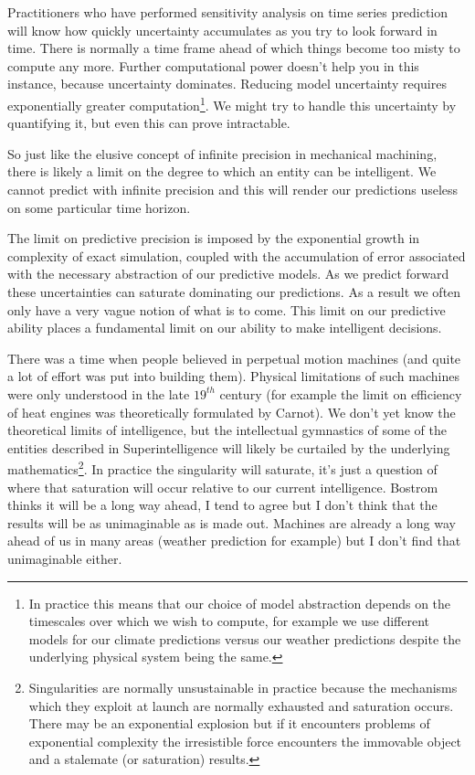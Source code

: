\documentclass[a4paper]{caesar_book}
\begin{document}
Practitioners who have performed sensitivity analysis on time series prediction will know how quickly uncertainty accumulates as you try to look forward in time. There is normally a time frame ahead of which things become too misty to compute any more. Further computational power doesn't help you in this instance, because uncertainty dominates. Reducing model uncertainty requires exponentially greater computation\footnote{In practice this means that our choice of model abstraction depends on the timescales over which we wish to compute, for example we use different models for our climate predictions versus our weather predictions despite the underlying physical system being the same.}. We might try to handle this uncertainty by quantifying it, but even this can prove intractable.

So just like the elusive concept of infinite precision in mechanical machining, there is likely a limit on the degree to which an entity can be intelligent. We cannot predict with infinite precision and this will render our predictions useless on some particular time horizon.

The limit on predictive precision is imposed by the exponential growth in complexity of exact simulation, coupled with the accumulation of error associated with the necessary abstraction of our predictive models. As we predict forward these uncertainties can saturate dominating our predictions. As a result we often only have a very vague notion of what is to come. This limit on our predictive ability places a fundamental limit on our ability to make intelligent decisions.

There was a time when people believed in perpetual motion machines (and quite a lot of effort was put into building them). Physical limitations of such machines were only understood in the late $19^{th}$ century (for example the limit on efficiency of heat engines was theoretically formulated by Carnot). We don’t yet know the theoretical limits of intelligence, but the intellectual gymnastics of some of the entities described in Superintelligence will likely be curtailed by the underlying mathematics\footnote{Singularities are normally unsustainable in practice because the mechanisms which they exploit at launch are normally exhausted and saturation occurs. There may be an exponential explosion but if it encounters problems of exponential complexity the irresistible force encounters the immovable object and a stalemate (or saturation) results.}. In practice the singularity will saturate, it’s just a question of where that saturation will occur relative to our current intelligence. Bostrom thinks it will be a long way ahead, I tend to agree but I don’t think that the results will be as unimaginable as is made out. Machines are already a long way ahead of us in many areas (weather prediction for example) but I don’t find that unimaginable either.
\end{document}

